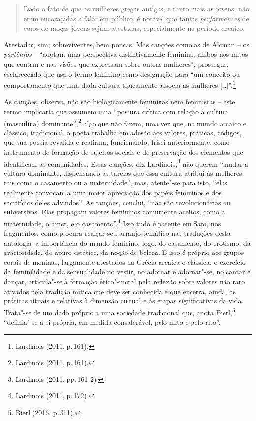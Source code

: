 \begin{quote}
Dado o fato de que as mulheres gregas antigas, e tanto mais as jovens, não eram encorajadas a falar em público, é notável que tantas \textit{performances} de coros de moças jovens sejam atestadas, especialmente no período arcaico.
\end{quote}

Atestadas, sim; sobreviventes, bem poucas. Mas canções como as de Álcman -- os \textit{partênios} -- ``adotam uma perspectiva distintivamente feminina, ambos nos mitos que contam e nas visões que expressam sobre outras mulheres'', prossegue, esclarecendo que usa o termo feminino como designação para ``um conceito ou comportamento que uma dada cultura tipicamente associa às mulheres {[}\ldots{}{]}''.\footnote{Lardinois (2011, p.\,161).}

As canções, observa, não são biologicamente femininas nem feministas -- este termo implicaria que assumem uma “postura crítica com relação à cultura (masculina) dominante”,\footnote{Lardinois (2011, p.\,161).} algo que não fazem, uma vez que, no mundo arcaico e clássico, tradicional, o poeta trabalha em adesão aos valores, práticas, códigos, que sua poesia revalida e reafirma, funcionando, frisei anteriormente, como instrumento de formação de sujeitos sociais e de preservação dos elementos que identificam as comunidades. Essas canções, diz Lardinois,\footnote{Lardinois (2011, pp.\,161-2).} não querem “mudar a cultura dominante, dispensando as tarefas que essa cultura atribui às mulheres, tais como o casamento ou a maternidade”, mas, atente"-se para isto, “elas realmente convocam a uma maior apreciação dos papéis femininos e dos sacrifícios deles advindos”. As canções, conclui, “não são revolucionárias ou subversivas. Elas propagam valores femininos comumente aceitos, como a maternidade, o amor, e o casamento”.\footnote{Lardinois (2011, p.\,172).} Isso tudo é patente em Safo, nos fragmentos, como procura realçar seu arranjo temático nas traduções desta antologia: a importância do mundo feminino, logo, do casamento, do erotismo, da graciosidade, do apuro estético, da noção de beleza. E isso é próprio aos grupos corais de meninas, largamente atestados na Grécia arcaica e clássica: o exercício da feminilidade e da sensualidade no vestir, no adornar e adornar"-se, no cantar e dançar, articula"-se à formação ético"-moral pela reflexão sobre valores não raro ativados pela tradição mítica que deve ser conhecida e que encerra, ainda, as práticas rituais e relativas à dimensão cultual e às etapas significativas da vida. Trata"-se de um dado próprio a uma sociedade tradicional que, anota Bierl,\footnote{Bierl (2016, p.\,311).} “definia"-se a si própria, em medida considerável, pelo mito e pelo rito”. 


